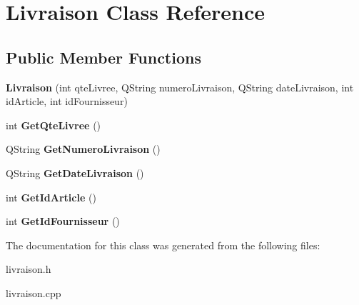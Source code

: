 \hypertarget{class_livraison}{}\section{Livraison Class Reference}
\label{class_livraison}
\subsection*{Public Member Functions}
\begin{DoxyCompactItemize}
\item 
\mbox{\label{class_livraison_a3745262b60705a9a87c5d030e619e1cb}} 
{\bfseries Livraison} (int qte\+Livree, Q\+String numero\+Livraison, Q\+String date\+Livraison, int id\+Article, int id\+Fournisseur)
\item 
\mbox{\label{class_livraison_a4995d5e50d6c62b1ab33725bae61b777}} 
int {\bfseries Get\+Qte\+Livree} ()
\item 
\mbox{\label{class_livraison_a76aab51a1430b445d8d9802d972f5b8e}} 
Q\+String {\bfseries Get\+Numero\+Livraison} ()
\item 
\mbox{\label{class_livraison_adc2aaa0aa7485d80d6471743b561aa32}} 
Q\+String {\bfseries Get\+Date\+Livraison} ()
\item 
\mbox{\label{class_livraison_afd597ae5578dd4d035a1f0ebb6dab560}} 
int {\bfseries Get\+Id\+Article} ()
\item 
\mbox{\label{class_livraison_abacc4cd612306dedfb785ff07f36617a}} 
int {\bfseries Get\+Id\+Fournisseur} ()
\end{DoxyCompactItemize}


The documentation for this class was generated from the following files\+:\begin{DoxyCompactItemize}
\item 
livraison.\+h\item 
livraison.\+cpp\end{DoxyCompactItemize}
